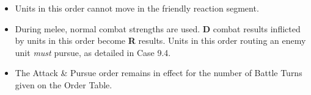 \begin{itemize}
  \item Units in this order cannot move in the friendly reaction segment.
  \item During melee, normal combat strengths are used. \textbf{D} combat results inflicted by units in this order become \textbf{R} results. Units in this order routing an enemy unit \textit{must} pursue, as detailed in Case 9.4.
  \item The Attack \& Pursue order remains in effect for the number of Battle Turns given on the Order Table.
\end{itemize}